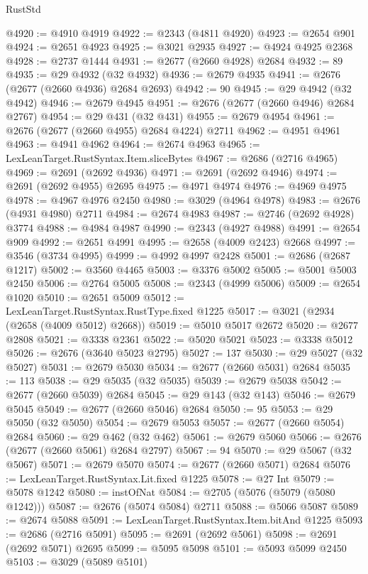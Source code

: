 \begin{lexlean}{RustStd}
\begin{coremodule}
@4920 := @4910 @4919
@4922 := @2343 (@4811 @4920)
@4923 := @2654 @901
@4924 := @2651 @4923
@4925 := @3021 @2935
@4927 := @4924 @4925 @2368
@4928 := @2737 @1444
@4931 := @2677 (@2660 @4928) @2684
@4932 := 89
@4935 := @29 @4932 (@32 @4932)
@4936 := @2679 @4935
@4941 := @2676 (@2677 (@2660 @4936) @2684 @2693)
@4942 := 90
@4945 := @29 @4942 (@32 @4942)
@4946 := @2679 @4945
@4951 := @2676 (@2677 (@2660 @4946) @2684 @2767)
@4954 := @29 @431 (@32 @431)
@4955 := @2679 @4954
@4961 := @2676 (@2677 (@2660 @4955) @2684 @4224) @2711
@4962 := @4951 @4961
@4963 := @4941 @4962
@4964 := @2674 @4963
@4965 := LexLeanTarget.RustSyntax.Item.sliceBytes
@4967 := @2686 (@2716 @4965)
@4969 := @2691 (@2692 @4936)
@4971 := @2691 (@2692 @4946)
@4974 := @2691 (@2692 @4955) @2695
@4975 := @4971 @4974
@4976 := @4969 @4975
@4978 := @4967 @4976 @2450
@4980 := @3029 (@4964 @4978)
@4983 := @2676 (@4931 @4980) @2711
@4984 := @2674 @4983
@4987 := @2746 (@2692 @4928) @3774
@4988 := @4984 @4987
@4990 := @2343 (@4927 @4988)
@4991 := @2654 @909
@4992 := @2651 @4991
@4995 := @2658 (@4009 @2423) @2668
@4997 := @3546 (@3734 @4995)
@4999 := @4992 @4997 @2428
@5001 := @2686 (@2687 @1217)
@5002 := @3560 @4465
@5003 := @3376 @5002
@5005 := @5001 @5003 @2450
@5006 := @2764 @5005
@5008 := @2343 (@4999 @5006)
@5009 := @2654 @1020
@5010 := @2651 @5009
@5012 := LexLeanTarget.RustSyntax.RustType.fixed @1225
@5017 := @3021 (@2934 (@2658 (@4009 @5012) @2668))
@5019 := @5010 @5017 @2672
@5020 := @2677 @2808
@5021 := @3338 @2361
@5022 := @5020 @5021
@5023 := @3338 @5012
@5026 := @2676 (@3640 @5023 @2795)
@5027 := 137
@5030 := @29 @5027 (@32 @5027)
@5031 := @2679 @5030
@5034 := @2677 (@2660 @5031) @2684
@5035 := 113
@5038 := @29 @5035 (@32 @5035)
@5039 := @2679 @5038
@5042 := @2677 (@2660 @5039) @2684
@5045 := @29 @143 (@32 @143)
@5046 := @2679 @5045
@5049 := @2677 (@2660 @5046) @2684
@5050 := 95
@5053 := @29 @5050 (@32 @5050)
@5054 := @2679 @5053
@5057 := @2677 (@2660 @5054) @2684
@5060 := @29 @462 (@32 @462)
@5061 := @2679 @5060
@5066 := @2676 (@2677 (@2660 @5061) @2684 @2797)
@5067 := 94
@5070 := @29 @5067 (@32 @5067)
@5071 := @2679 @5070
@5074 := @2677 (@2660 @5071) @2684
@5076 := LexLeanTarget.RustSyntax.Lit.fixed @1225
@5078 := @27 Int
@5079 := @5078 @1242
@5080 := instOfNat
@5084 := @2705 (@5076 (@5079 (@5080 @1242)))
@5087 := @2676 (@5074 @5084) @2711
@5088 := @5066 @5087
@5089 := @2674 @5088
@5091 := LexLeanTarget.RustSyntax.Item.bitAnd @1225
@5093 := @2686 (@2716 @5091)
@5095 := @2691 (@2692 @5061)
@5098 := @2691 (@2692 @5071) @2695
@5099 := @5095 @5098
@5101 := @5093 @5099 @2450
@5103 := @3029 (@5089 @5101)

\end{coremodule}
\end{lexlean}
